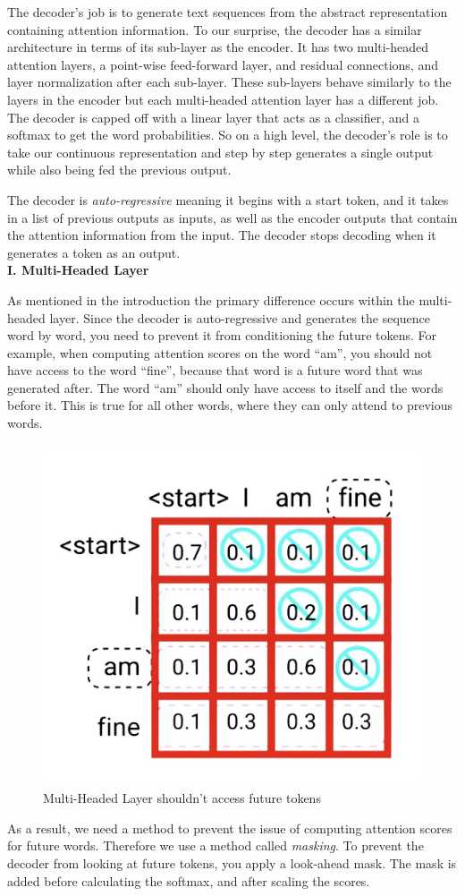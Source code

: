 The decoder’s job is to generate text sequences from the abstract representation containing attention information. To our surprise, the decoder has a similar architecture in terms of its sub-layer as the encoder. It has two multi-headed attention layers, a point-wise feed-forward layer, and residual connections, and layer normalization after each sub-layer. These sub-layers behave similarly to the layers in the encoder but each multi-headed attention layer has a different job. The decoder is capped off with a linear layer that acts as a classifier, and a softmax to get the word probabilities. So on a high level, the decoder's role is to take our continuous representation and step by step generates a single output while also being fed the previous output.

The decoder is \emph{auto-regressive} meaning it begins with a start token, and it takes in a list of previous outputs as inputs, as well as the encoder outputs that contain the attention information from the input. The decoder stops decoding when it generates a token as an output. \\

\noindent
\textbf{I. Multi-Headed Layer}

As mentioned in the introduction the primary difference occurs within the multi-headed layer. Since the decoder is auto-regressive and generates the sequence word by word, you need to prevent it from conditioning the future tokens. For example, when computing attention scores on the word “am”, you should not have access to the word “fine”, because that word is a future word that was generated after. The word “am” should only have access to itself and the words before it. This is true for all other words, where they can only attend to previous words.

\begin{figure}[H]
\centering
\includegraphics[width=.3\textwidth]{figures/t12.jpg}
\caption{Multi-Headed Layer shouldn't access future tokens}
\end{figure}

As a result, we need a method to prevent the issue of computing attention scores for future words. Therefore we use a method called \emph{masking}. To prevent the decoder from looking at future tokens, you apply a look-ahead mask. The mask is added before calculating the softmax, and after scaling the scores. \\

